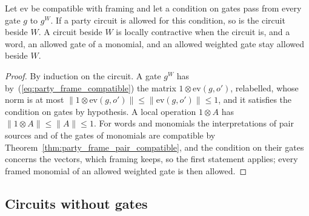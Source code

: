 \begin{theorem}
    \label{thm:party_frame_allowed}
    \leanok
    Let $\mathrm{ev}$ be compatible with framing and let a condition on gates pass
    from every gate $g$ to $g^W$. If a party circuit is allowed for this condition,
    so is the circuit beside $W$. A circuit beside $W$ is locally contractive when
    the circuit is, and a word, an allowed gate of a monomial, and an allowed
    weighted gate stay allowed beside $W$.
\end{theorem}
\begin{proof}\leanok
    By induction on the circuit. A gate $g^W$ has by~(\ref{eq:party_frame_compatible})
    the matrix $1\otimes\mathrm{ev}(g,o')$, relabelled, whose norm is at most
    $\lVert1\otimes\mathrm{ev}(g,o')\rVert\le\lVert\mathrm{ev}(g,o')\rVert\le1$, and
    it satisfies the condition on gates by hypothesis. A local operation
    $1\otimes A$ has $\lVert1\otimes A\rVert\le\lVert A\rVert\le1$. For words and
    monomials the interpretations of pair sources and of the gates of monomials are
    compatible by Theorem~\ref{thm:party_frame_pair_compatible}, and the condition on
    their gates concerns the vectors, which framing keeps, so the first statement
    applies; every framed monomial of an allowed weighted gate is then allowed.
\end{proof}

\subsection{Circuits without gates}
\label{sec:party_local}

